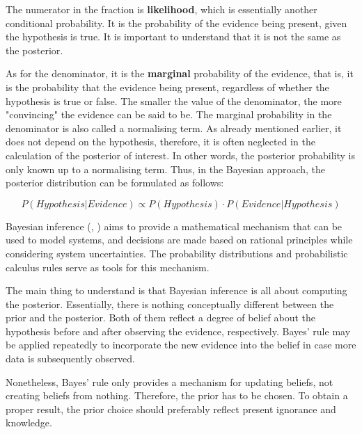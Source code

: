 The numerator in the fraction is \textbf{likelihood}, which is essentially another conditional probability. It is the probability of the evidence being present, given the hypothesis is true. It is important to understand that it is not the same as the posterior.

As for the denominator, it is the \textbf{marginal} probability of the evidence, that is, it is the probability that the evidence being present, regardless of whether the hypothesis is true or false. The smaller the value of the denominator, the more "convincing" the evidence can be said to be. The marginal probability in the denominator is also called a normalising term.  As already mentioned earlier, it does not depend on the hypothesis, therefore, it is often neglected in the calculation of the posterior of interest.  In other words, the posterior probability is only known up to a normalising term. Thus, in the Bayesian approach, the posterior distribution can be formulated as follows:

\begin{equation}
P(Hypothesis|Evidence) \propto P(Hypothesis) \cdot P(Evidence|Hypothesis)
\label{eq:bayes_rule_without_normalising_term}
\end{equation}

Bayesian inference (\cite{gelman_bayesian_2003}, \cite{bernardo_bayesian_2009}) aims to provide a mathematical mechanism that can be used to model systems, and decisions are made based on rational principles while considering system uncertainties. The probability distributions and probabilistic calculus rules serve as tools for this mechanism.

The main thing to understand is that Bayesian inference is all about computing the posterior. Essentially, there is nothing conceptually different between the prior and the posterior. Both of them reflect a degree of belief about the hypothesis before and after observing the evidence, respectively. Bayes' rule may be applied repeatedly to incorporate the new evidence into the belief in case more data is subsequently observed.

Nonetheless, Bayes’ rule only provides a mechanism for updating beliefs, not creating beliefs from nothing. Therefore, the prior has to be chosen. To obtain a proper result, the prior choice should preferably reflect present ignorance and knowledge.

